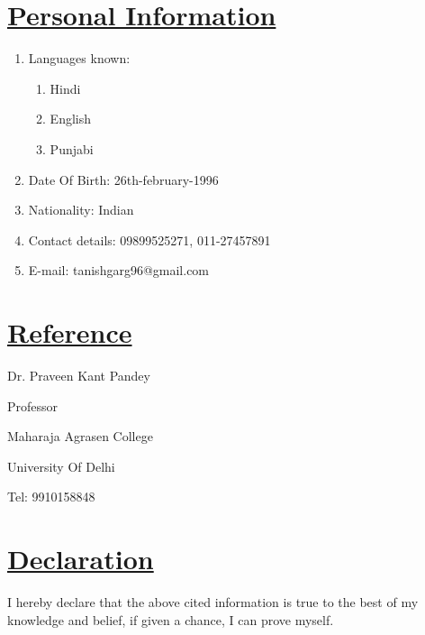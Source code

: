 \documentclass[14pt,a4paper,twoside]{article}
\begin{document}
	\section*{\underline{\textbf{Personal Information}}}
		\begin{enumerate}
			\item Languages known:
				\begin{enumerate}
					\item Hindi
					\item English
					\item Punjabi
				\end{enumerate}
			\item Date Of Birth: 26th-february-1996
			\item Nationality: Indian
			\item Contact details: 09899525271, 011-27457891
			\item E-mail: tanishgarg96@gmail.com
		\end{enumerate}
		
	\section*{\underline{\textbf{Reference}}}

\hspace{12pt} Dr. Praveen Kant Pandey

Professor

Maharaja Agrasen College

University Of Delhi

Tel: 9910158848    
	
	\section*{\underline{\textbf{Declaration}}}
		I hereby declare that the above cited information is true to the best of my knowledge and belief, if given a chance, I can prove myself.
	
	
\end{document}
